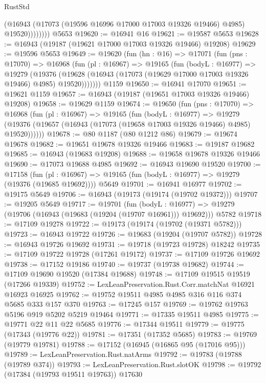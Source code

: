 \begin{lexlean}{RustStd}
\begin{coremodule}
                  (@16943 (@17073 (@19596 @16996 @17000 @17003 @19326 @19466) @4985) @19520))))))))
    @5653
@19620 := @16941 @16
@19621 := @19587 @5653
@19628 := @16943 (@19187 (@19621 @17000 @17003 @19326 @19466) @19208)
@19629 := @19596 @5653
@19649 := @19620
    (fun (hn : @16) =>
    @17071
      (fun (pns : @17070) =>
      @16968
        (fun (pl : @16967) =>
        @19165
          (fun (bodyL : @16977) =>
          @19279
            (@19376
              (@19628 (@16943 (@17073 (@19629 @17000 @17003 @19326 @19466) @4985) @19520)))))))
    @1159
@19650 := @16941 @17070
@19651 := @19621 @1159
@19657 := @16943 (@19187 (@19651 @17003 @19326 @19466) @19208)
@19658 := @19629 @1159
@19674 := @19650
    (fun (pns : @17070) =>
    @16968
      (fun (pl : @16967) =>
      @19165
        (fun (bodyL : @16977) =>
        @19279 (@19376 (@19657 (@16943 (@17073 (@19658 @17003 @19326 @19466) @4985) @19520))))))
@19678 := @80 @1187 (@80 @1212 @86)
@19679 := @19674 @19678
@19682 := @19651 @19678 @19326 @19466
@19683 := @19187 @19682
@19685 := @16943 (@19683 @19208)
@19688 := @19658 @19678 @19326 @19466
@19690 := @17073 @19688 @4985
@19692 := @16943 @19690 @19520
@19700 := @17158
    (fun (pl : @16967) => @19165 (fun (bodyL : @16977) => @19279 (@19376 (@19685 @19692))))
    @5649
@19701 := @16941 @16977
@19702 := @19175 @5649
@19706 := @16943 (@19173 (@19174 (@19702 @19372)))
@19707 := @19205 @5649
@19717 := @19701
    (fun (bodyL : @16977) => @19279 (@19706 (@16943 (@19683 (@19204 (@19707 @16961))) @19692)))
    @5782
@19718 := @17109 @19278
@19722 := @19173 (@19174 (@19702 (@19371 @5782)))
@19723 := @16943 @19722
@19726 := @19683 (@19204 (@19707 @5782))
@19728 := @16943 @19726 @19692
@19731 := @19718 (@19723 @19728) @18242
@19735 := @17109 @19722 @19728 (@17261 @19172)
@19737 := @17109 @19726 @19692
@19738 := @17152 @19186
@19740 := @19737 (@19738 @19682)
@19744 := @17109 @19690 @19520 (@17384 @19688)
@19748 := @17109 @19515 @19519 (@17266 @19339)
@19752 := LexLeanPreservation.Rust.Corr.matchNat @16921 @16923 @16925
@19762 := @19752 @19511 @4985 @4985 @316 @116 @374 @5685 @333 @157 @370
@19763 := @17245 @157
@19769 := @19762 @19763 @5196 @919 @5202 @5219 @19464
@19771 := @17335 @19511 @4985
@19775 := @19771 @22 @11 @22 @5685
@19776 := @17344 @19511
@19779 := @19775 (@17343 (@19776 @22))
@19781 := @17351 (@17352 @5685)
@19783 := @19769 (@19779 @19781)
@19788 := @17152 (@16945 (@16865 @95 (@17016 @95)))
@19789 := LexLeanPreservation.Rust.natArms
@19792 := @19783 (@19788 (@19789 @374))
@19793 := LexLeanPreservation.Rust.slotOK
@19798 := @19792 (@17384 (@19793 @19511 @19763)) @17630

\end{coremodule}
\end{lexlean}
